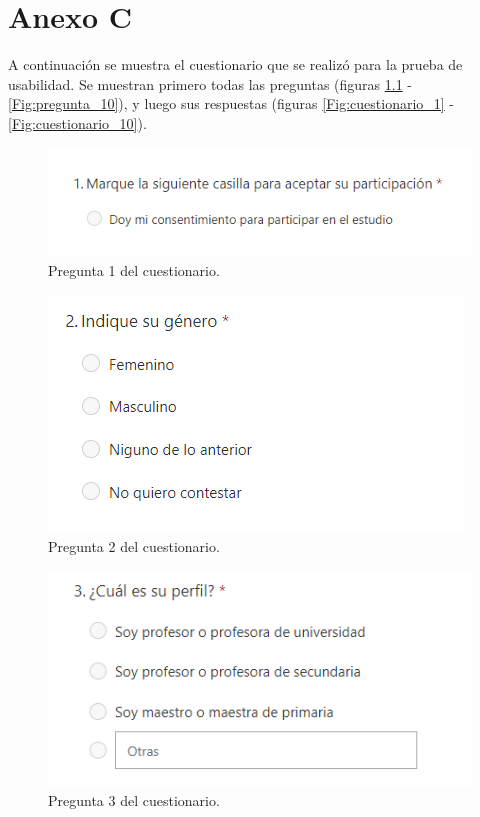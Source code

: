 \chapter{Anexo C}
\label{cap:AnexoC}

A continuación se muestra el cuestionario que se realizó para la prueba de usabilidad.
Se muestran primero todas las preguntas (figuras \ref{Fig:pregunta_1} - \ref{Fig:pregunta_10}), y luego sus respuestas (figuras \ref{Fig:cuestionario_1} - \ref{Fig:cuestionario_10}).

\begin{figure}[h]
\centering\includegraphics[width=0.5\linewidth]{figs/pregunta_1.png}
\caption{Pregunta 1 del cuestionario.}
\label{Fig:pregunta_1}
\end{figure}

\begin{figure}[h]
\centering\includegraphics[width=0.5\linewidth]{figs/pregunta_2.png}
\caption{Pregunta 2 del cuestionario.}
\label{Fig:pregunta_2}
\end{figure}

\begin{figure}[h]
\centering\includegraphics[width=0.5\linewidth]{figs/pregunta_3.png}
\caption{Pregunta 3 del cuestionario.}
\label{Fig:pregunta_3}
\end{figure}

